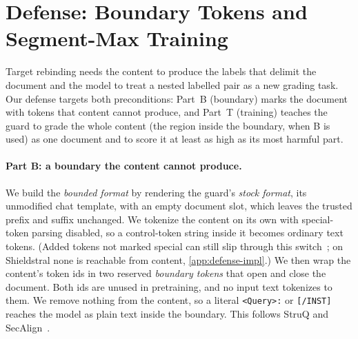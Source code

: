 \section{Defense: Boundary Tokens and Segment-Max Training}
\label{sec:defense}

Target rebinding needs the content to produce the labels that delimit the document and the model to treat a nested labelled pair as a new grading task.
Our defense targets both preconditions: Part~B (boundary) marks the document with tokens that content cannot produce, and Part~T (training) teaches the guard to grade the whole content (the region inside the boundary, when B is used) as one document and to score it at least as high as its most harmful part.

\paragraph{Part B: a boundary the content cannot produce.}
We build the \emph{bounded format} by rendering the guard's \emph{stock format}, its unmodified chat template, with an empty document slot, which leaves the trusted prefix and suffix unchanged.
We tokenize the content on its own with special-token parsing disabled, so a control-token string inside it becomes ordinary text tokens. (Added tokens not marked special can still slip through this switch~\citep{zhan2026samebytes,yang2026nameless}; on Shieldstral none is reachable from content, \cref{app:defense-impl}.)
We then wrap the content's token ids in two reserved \emph{boundary tokens} that open and close the document.
Both ids are unused in pretraining, and no input text tokenizes to them. %
We remove nothing from the content, so a literal \texttt{<Query>:} or \texttt{[/INST]} reaches the model as plain text inside the boundary.
This follows StruQ and SecAlign~\citep{chen2024struq,chen2024secalign}.

